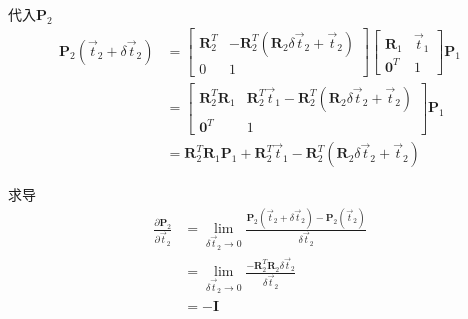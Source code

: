 \documentclass{article}
\begin{document}
代入$\boldsymbol{P}_2$
\begin{equation}
	\begin{aligned}
		\boldsymbol{P}_2(\vec{t}_2+\delta \vec{t}_2) & =                                                                                              
		\left[ 
		\begin{matrix}
		\boldsymbol{R}_2^{T}                         & -\boldsymbol{R}_2^{T}(\boldsymbol{R}_2\delta \vec{t}_2+\vec{t}_2)                              \\
		0                                            & 1                                                                                              
		\end{matrix} 
		\right]
		\left[ 
		\begin{matrix} 
		\boldsymbol{R}_1                             & \vec{t}_1                                                                                      \\ 
		\boldsymbol{0}^T                             & 1                                                                                              
		\end{matrix}
		\right]   
		\boldsymbol{P}_1\\&=
		\left[ 
		\begin{matrix}
		\boldsymbol{R}_2^{T} \boldsymbol{R}_1        & \boldsymbol{R}_2^{T}\vec{t}_1-\boldsymbol{R}_2^{T}(\boldsymbol{R}_2\delta \vec{t}_2+\vec{t}_2) \\ 
		\boldsymbol{0}^T                             & 1                                                                                              
		\end{matrix}
		\right]  \boldsymbol{P}_1 \\&= 
		\boldsymbol{R}_2^{T} \boldsymbol{R}_1\boldsymbol{P}_1 +\boldsymbol{R}_2^{T}\vec{t}_1-\boldsymbol{R}_2^{T}(\boldsymbol{R}_2\delta \vec{t}_2+\vec{t}_2)
	\end{aligned}
\end{equation}

求导
\begin{equation}
	\begin{aligned}
		\frac{\partial{\boldsymbol{P}_2}}{\partial{\vec{t}_2}} & = 
		\lim_{\delta \vec{t}_2\rightarrow0}
		\frac{\boldsymbol{P}_2(\vec{t}_2+\delta \vec{t}_2)-\boldsymbol{P}_2(\vec{t}_2)}
		{\delta \vec{t}_2}\\&=
		\lim_{\delta \vec{t}_2\rightarrow0}
		\frac{-\boldsymbol{R}_2^{T}\boldsymbol{R}_2\delta\vec{t}_2}
		{\delta \vec{t}_2}\\&=
		-\boldsymbol{I}
	\end{aligned}
\end{equation}
\end{document}
